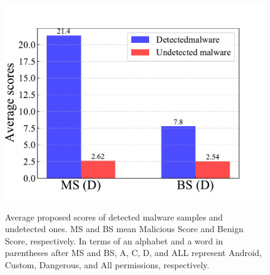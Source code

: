 \documentclass{ieeeaccess}
\begin{document}
\begin{figure}[t]
{    \includegraphics[scale=0.255]{./figures/kato13.pdf}
  } 
  \caption{Average proposed scores of detected malware samples and undetected ones. MS and BS mean Malicious Score and Benign Score, respectively. In terms of an alphabet and a word in parentheses after MS and BS, A, C, D, and ALL represent Android, Custom, Dangerous, and All permissions, respectively.}
  \label{fig:score_mal}
\end{figure}
\end{document}
